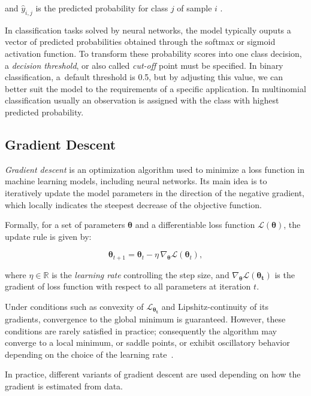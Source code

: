 and \(\hat{y}_{i,j}\) is the predicted probability for class $j$  of sample $i$ .

In classification tasks solved by neural networks, the model typically ouputs \break a vector of predicted probabilities obtained through the softmax or sigmoid activation function. To transform these probability scores into one class decision, a \emph{decision threshold}, or also called \textit{cut-off} point must be specified. In binary classification, a~default threshold is 0.5, but by adjusting this value, we can better suit the model to the requirements of a specific application. In multinomial classification usually an observation is assigned with the class with highest predicted probability.

\subsection{Gradient Descent}
\label{sec:gradient-descent}
\emph{Gradient descent} is an optimization algorithm used to minimize a loss function in machine learning models, including neural networks. Its main idea is to iteratively update the model parameters in the direction of the negative gradient, which locally indicates the steepest decrease of the objective function. 

Formally, for a set of parameters $\boldsymbol{\theta}$ and a differentiable loss function $\mathcal{L}(\boldsymbol{\theta})$, the update rule is given by:


\begin{equation*}
    \boldsymbol{\theta}_{t+1} = \boldsymbol{\theta}_t - \eta \, \nabla_{\boldsymbol{\theta}} \mathcal{L}(\boldsymbol{\boldsymbol{\theta}}_t),
\end{equation*}

where $\eta \in \mathbb{R}$ is the \textit{learning rate} controlling the step size, and $\nabla_{\boldsymbol{\theta}}\mathcal{L}(\boldsymbol{\theta_t})$ is the gradient of loss function with respect to all parameters at iteration $t$.

Under conditions such as convexity of $\mathcal{L}_{\boldsymbol{\theta_t}}$ and Lipshitz-continuity of its gradients, convergence to the global minimum is guaranteed. However, these conditions are rarely satisfied in practice; consequently the algorithm may converge to a local minimum, or saddle points, or exhibit oscillatory behavior depending on the choice of the learning rate~\cite{boyd2004}.

In practice, different variants of gradient descent are used depending on how the gradient is estimated from data.

